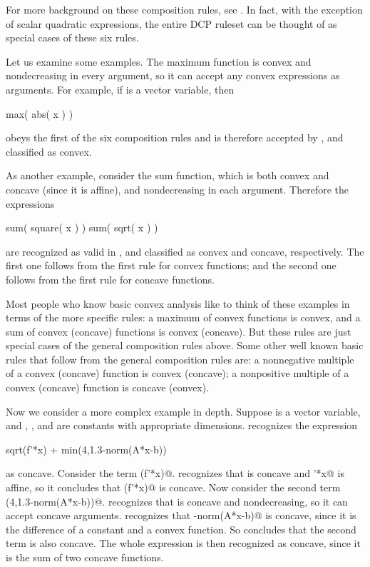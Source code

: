 \documentclass[12pt]{article}
\begin{document}
For more background on these composition rules, see \cite[\S3.2.4]{BV:04}.
In fact, with the exception of scalar quadratic expressions,
the entire DCP ruleset can be thought of as special cases
of these six rules.

Let us examine some examples.
The maximum function is convex and nondecreasing in every argument,
so it can accept any convex expressions as arguments.
For example, if \verb@x@ is a vector variable, then 
\begin{code}
	max( abs( x ) )
\end{code}
obeys the first of the six composition rules and is therefore accepted
by \cvx, and classified as convex.


As another example, consider the sum function, which is both
convex and concave (since it is affine), and nondecreasing 
in each argument.  Therefore the expressions
\begin{code}
	sum( square( x ) )
	sum( sqrt( x ) )
\end{code}
are recognized as valid in \cvx, and classified as 
convex and concave, respectively.
The first one follows from the first rule for convex functions;
and the second one follows from the first rule for concave functions.

Most people who know basic convex analysis like to think of these
examples in terms of the more specific rules:
a maximum of convex functions is convex, and a sum of convex (concave)
functions is convex (concave). 
But these rules are just special cases of the general composition 
rules above.
Some other well known basic rules that follow from the 
general composition rules are:
a nonnegative multiple of a convex (concave) function is convex (concave);
a nonpositive multiple of a convex (concave) function is concave (convex).

Now we consider a more complex example in depth. Suppose
\verb@x@ is a vector variable, and
\verb@A@, \verb@b@, and \verb@f@ are 
constants with appropriate dimensions.  \cvx recognizes the
expression
\begin{code}
sqrt(f'*x) + min(4,1.3-norm(A*x-b))
\end{code}
as concave. Consider the term \verb@sqrt(f'*x)@. \cvx
recognizes that \verb@sqrt@ is concave and \verb@f'*x@ is affine,
so it concludes that \verb@sqrt(f'*x)@ is concave. Now consider
the second term \verb@min(4,1.3-norm(A*x-b))@. \cvx
recognizes that \verb@min@ is concave and nondecreasing, so
it can accept concave arguments.
\cvx recognizes that -norm(A*x-b)@ is concave,
since it is the difference of a constant and a convex function. So \cvx
concludes that the second term is also concave.
The whole expression is then recognized as concave,
since it is the sum of two concave functions.
\end{document}
